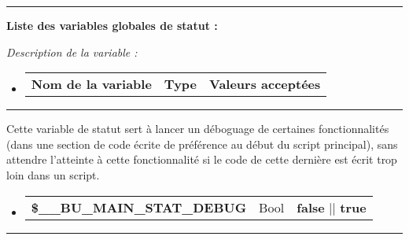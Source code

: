 \documentclass[a4paper,10pt]{article}
\begin{document}

\par\noindent\rule{\textwidth}{0.4pt}

\begin{justify}
     \textbf{Liste des variables globales de statut :}
\end{justify}

\begin{justify}
    \textit{Description de la variable :}
\end{justify}

\begin{justify}
     \begin{itemize}
        \item
        {
            \begin{tabular}{l|l|l}
                \textbf{Nom de la variable} & \textbf{Type} & \textbf{Valeurs acceptées}
            \end{tabular}
        }
    \end{itemize}
\end{justify}


\par\noindent\rule{\textwidth}{0.4pt}

\begin{justify}
    Cette variable de statut sert à lancer un déboguage de certaines fonctionnalités (dans une section de code écrite de préférence au début du script principal), sans attendre l'atteinte à cette fonctionnalité si le code de cette dernière est écrit trop loin dans un script.
\end{justify}

\begin{justify}
     \begin{itemize}
        \item
        {
            \begin{tabular}{l|l|l}
                \textbf{\color{orange}\$\_\_BU\_MAIN\_STAT\_DEBUG}  & Bool & \textbf{false} || \textbf{true} \\[1\baselineskip]
            \end{tabular}
        }
    \end{itemize}
\end{justify}


\par\noindent\rule{\textwidth}{0.4pt}
\end{document}
